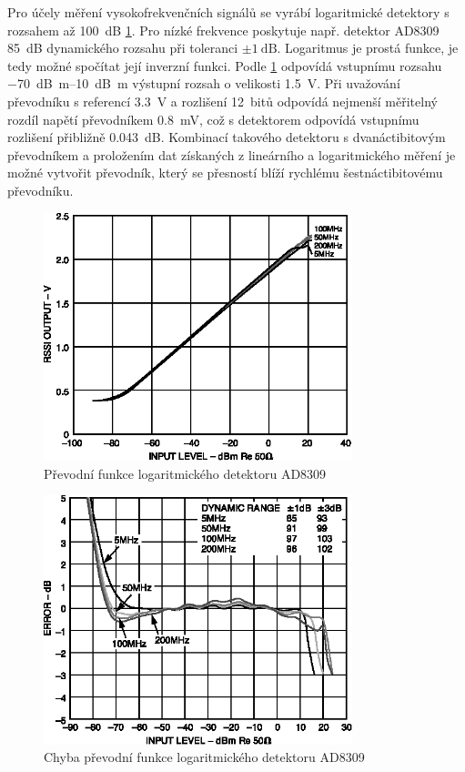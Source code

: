 Pro účely měření vysokofrekvenčních signálů se vyrábí logaritmické detektory s rozsahem až \SI{100}{\deci\bel} \cite{AD8309datasheet} \ref{ad8309function}. Pro nízké frekvence poskytuje např. detektor AD8309 \SI{85}{\deci\bel} dynamického rozsahu při toleranci $\pm \SI{1}{\deci\bel}$. Logaritmus je prostá funkce, je tedy možné spočítat její inverzní funkci. Podle \ref{ad8309function} odpovídá vstupnímu rozsahu \SIrange{-70}{10}{\deci\bel m} výstupní rozsah o velikosti \SI{1.5}{\volt}. Při uvažování převodníku s referencí \SI{3.3}{\volt} a rozlišení 12~bitů odpovídá nejmenší měřitelný rozdíl napětí převodníkem \SI{0.8}{\milli\volt}, což s detektorem odpovídá vstupnímu rozlišení přibližně \SI{0.043}{\deci\bel}. Kombinací takového detektoru s dvanáctibitovým převodníkem a proložením dat získaných z lineárního a logaritmického měření je možné vytvořit převodník, který se přesností blíží rychlému šestnáctibitovému převodníku.

\begin{figure}[htbp]\includegraphics[width=0.8\textwidth,keepaspectratio]{images/AD8309_function.eps}\caption{Převodní funkce logaritmického detektoru AD8309 \cite{AD8309datasheet}}\label{ad8309function}\end{figure}	

\begin{figure}[htbp]\includegraphics[width=0.8\textwidth,keepaspectratio]{images/AD8309_error.eps}\caption{Chyba převodní funkce logaritmického detektoru AD8309 \cite{AD8309datasheet}}\label{ad8309error}\end{figure}

